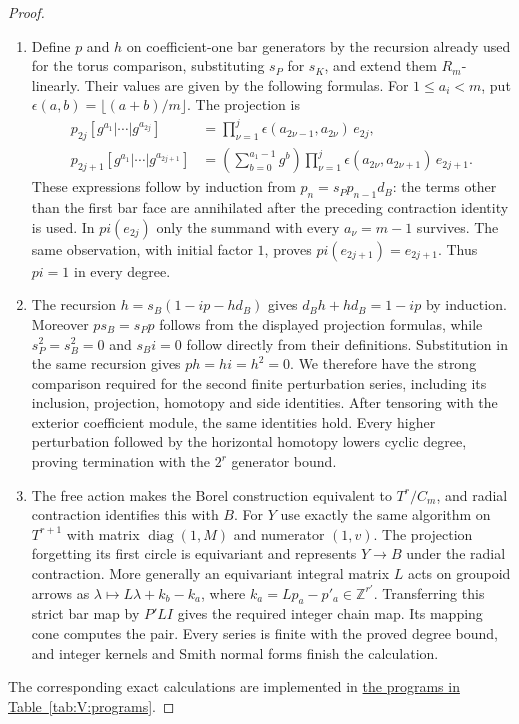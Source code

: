 \documentclass[11pt,a4paper]{article}
\numberwithin{equation}{section}
\theoremstyle{definition}
\begin{document}
\begin{proof}
\begin{enumerate}[label=\arabic*.]
\item Define $p$ and $h$ on coefficient-one bar generators by the
recursion already used for the torus comparison, substituting
$s_P$ for $s_K$, and extend them $R_m$-linearly.  Their values
are given by the following formulas.
For $1\leq a_i<m$, put
$\epsilon(a,b)=\lfloor(a+b)/m\rfloor$.  The projection is
\[
\begin{split}
 p_{2j}[g^{a_1}|\cdots|g^{a_{2j}}]
   &=\prod_{\nu=1}^{j}\epsilon(a_{2\nu-1},a_{2\nu})\,e_{2j},\\
 p_{2j+1}[g^{a_1}|\cdots|g^{a_{2j+1}}]
   &=\left(\sum_{b=0}^{a_1-1}g^b\right)
       \prod_{\nu=1}^{j}\epsilon(a_{2\nu},a_{2\nu+1})\,e_{2j+1}.
\end{split}
\]
These expressions follow by induction from
$p_n=s_Pp_{n-1}d_B$: the terms other than the first bar face
are annihilated after the preceding contraction identity is
used.  In $pi(e_{2j})$ only the summand with every
$a_\nu=m-1$ survives.  The same observation, with initial
factor $1$, proves $pi(e_{2j+1})=e_{2j+1}$.
Thus $pi=1$ in every degree.

\item The recursion
$h=s_B(1-ip-hd_B)$ gives $d_Bh+hd_B=1-ip$ by induction.
Moreover $p s_B=s_Pp$ follows from the displayed projection
formulas, while $s_P^2=s_B^2=0$ and $s_Bi=0$ follow directly
from their definitions.  Substitution in the same recursion
gives $ph=hi=h^2=0$.  We therefore have the strong comparison
required for the second finite perturbation series, including
its inclusion, projection, homotopy and side identities.
After tensoring with the exterior coefficient module, the
same identities hold.  Every higher perturbation followed by the horizontal homotopy lowers cyclic degree, proving termination with the $2^r$ generator bound.

\item The free action makes the Borel construction equivalent to
$T^r/C_m$, and radial contraction identifies this with $B$.
For $Y$ use exactly the same algorithm on $T^{r+1}$ with
matrix $\operatorname{diag}(1,M)$ and numerator $(1,v)$.
The projection forgetting its first circle is equivariant and
represents $Y\to B$ under the radial contraction.
More generally an equivariant integral matrix $L$ acts on
groupoid arrows as
$\lambda\mapsto L\lambda+k_b-k_a$, where
$k_a=Lp_a-p'_a\in\mathbb Z^{r'}$.
Transferring this strict bar map by $P'LI$ gives the required
integer chain map.  Its mapping cone computes the pair.
Every series is finite with the proved degree bound, and
integer kernels and Smith normal forms finish the calculation.
\end{enumerate}
The corresponding exact calculations are implemented in \hyperlink{prog:V:chains}{the programs in Table~\ref*{tab:V:programs}}.
\end{proof}
\end{document}
